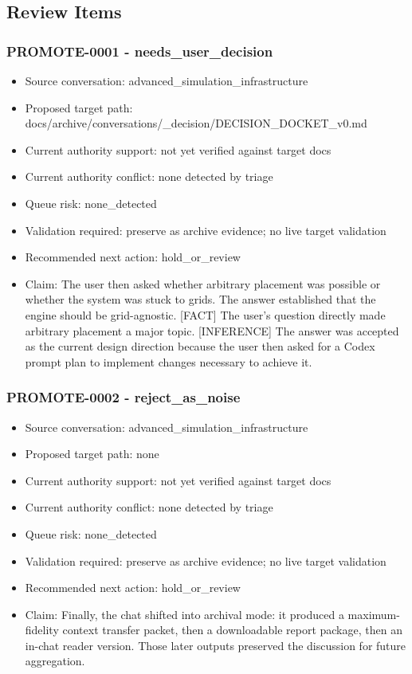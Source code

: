 \documentclass[11pt,a4paper]{report}
\begin{document}
\subsection{Review Items}

\subsubsection{PROMOTE-0001 - needs\_user\_decision}

\begin{itemize}
\item Source conversation: advanced\_simulation\_infrastructure
\item Proposed target path: docs/archive/conversations/\_decision/DECISION\_DOCKET\_v0.md
\item Current authority support: not yet verified against target docs
\item Current authority conflict: none detected by triage
\item Queue risk: none\_detected
\item Validation required: preserve as archive evidence; no live target validation
\item Recommended next action: hold\_or\_review
\item Claim: The user then asked whether arbitrary placement was possible or whether the system was stuck to grids. The answer established that the engine should be grid-agnostic. [FACT] The user's question directly made arbitrary placement a major topic. [INFERENCE] The answer was accepted as the current design direction because the user then asked for a Codex prompt plan to implement changes necessary to achieve it.
\end{itemize}

\subsubsection{PROMOTE-0002 - reject\_as\_noise}

\begin{itemize}
\item Source conversation: advanced\_simulation\_infrastructure
\item Proposed target path: none
\item Current authority support: not yet verified against target docs
\item Current authority conflict: none detected by triage
\item Queue risk: none\_detected
\item Validation required: preserve as archive evidence; no live target validation
\item Recommended next action: hold\_or\_review
\item Claim: Finally, the chat shifted into archival mode: it produced a maximum-fidelity context transfer packet, then a downloadable report package, then an in-chat reader version. Those later outputs preserved the discussion for future aggregation.
\end{itemize}
\end{document}
